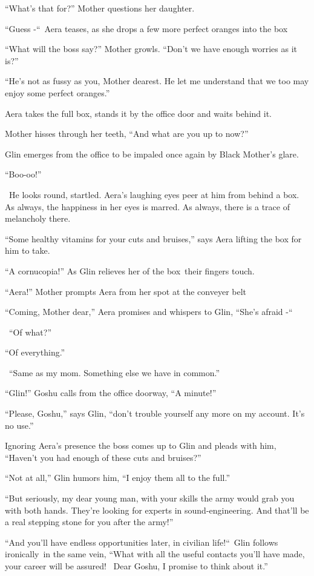 \documentclass[twoside,11pt]{book}
\begin{document}
``What's that for?'' Mother questions her daughter.

``Guess -``~Aera teases, as she drops a few more perfect oranges into the box

``What will the boss say?'' Mother growls. ``Don't we have enough worries as it
is?'' 

``He's not as fussy as you, Mother dearest. He let me understand that we too may enjoy some perfect
oranges.'' 

Aera takes the full box, stands it by the office door and waits behind it.

Mother hisses through her teeth, ``And what are you up to now?''

Glin emerges from the office to be impaled once again by Black Mother's glare. 

``Boo-oo!''

~He looks round, startled. Aera's laughing eyes peer at him from behind a box. As always, the happiness in her eyes is
marred. As always, there is a trace of melancholy there.

``Some healthy vitamins for your cuts and bruises,'' says Aera lifting the box for him to
take. 

``A cornucopia!'' As Glin relieves her of the box~their fingers touch.

``Aera!'' Mother prompts Aera from her spot at the conveyer belt 

``Coming, Mother dear,'' Aera promises and whispers to Glin, ``She's afraid
-``\ 

~``Of what?'' 

``Of everything.'' 

~``Same as my mom. Something else we have in common.''

``Glin!'' Goshu calls from the office doorway, ``A minute!'' 

``Please, Goshu,'' says Glin, ``don't trouble yourself any more on my account.
It's no use.''

Ignoring Aera's presence the boss comes up to Glin and pleads with him, ``Haven't you had enough of these
cuts and bruises?''

``Not at all,'' Glin humors him, ``I enjoy them all to the full.''

``But seriously, my dear young man, with your skills the army would grab you with both hands. They're
looking for experts in sound-engineering. And that'll be a real stepping stone for you after the army!'' 

``And you'll have endless opportunities later, in civilian life!``\  Glin follows
ironically{\ }in the same vein, ``What with all the useful contacts you'll have made, your
career will be assured! ~Dear Goshu, I promise to think about it.'' 
\end{document}
